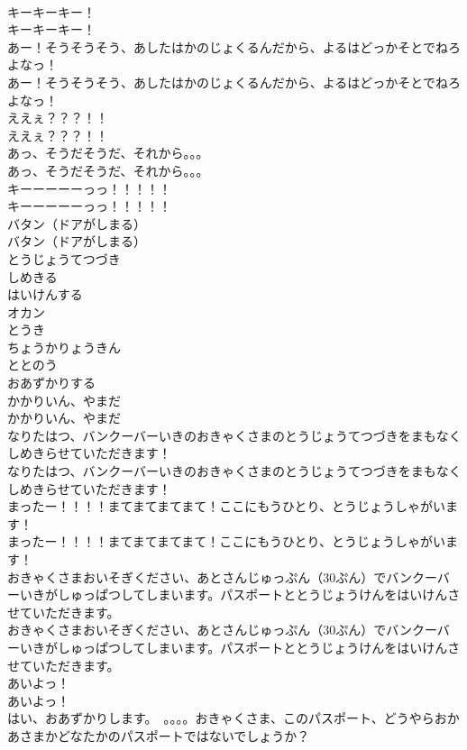 \documentclass[8pt]{extreport}
\begin{document}
\begin{CJK}{UTF8}{min}
\\	キーキーキー！
\\	キーキーキー！
\\	あー！そうそうそう、あしたはかのじょくるんだから、よるはどっかそとでねろよなっ！
\\	あー！そうそうそう、あしたはかのじょくるんだから、よるはどっかそとでねろよなっ！
\\	ええぇ？？？！！
\\	ええぇ？？？！！
\\	あっ、そうだそうだ、それから。。。
\\	あっ、そうだそうだ、それから。。。
\\	キーーーーーっっ！！！！！
\\	キーーーーーっっ！！！！！
\\	バタン（ドアがしまる）
\\	バタン（ドアがしまる）
\\	とうじょうてつづき
\\	しめきる
\\	はいけんする
\\	オカン
\\	とうき
\\	ちょうかりょうきん
\\	ととのう
\\	おあずかりする
\\	かかりいん、やまだ
\\	かかりいん、やまだ
\\	なりたはつ、バンクーバーいきのおきゃくさまのとうじょうてつづきをまもなくしめきらせていただきます！
\\	なりたはつ、バンクーバーいきのおきゃくさまのとうじょうてつづきをまもなくしめきらせていただきます！
\\	まったー！！！！まてまてまてまて！ここにもうひとり、とうじょうしゃがいます！
\\	まったー！！！！まてまてまてまて！ここにもうひとり、とうじょうしゃがいます！
\\	おきゃくさまおいそぎください、あとさんじゅっぷん（30ぷん）でバンクーバーいきがしゅっぱつしてしまいます。パスポートととうじょうけんをはいけんさせていただきます。
\\	おきゃくさまおいそぎください、あとさんじゅっぷん（30ぷん）でバンクーバーいきがしゅっぱつしてしまいます。パスポートととうじょうけんをはいけんさせていただきます。
\\	あいよっ！
\\	あいよっ！
\\	はい、おあずかりします。　。。。。おきゃくさま、このパスポート、どうやらおかあさまかどなたかのパスポートではないでしょうか？

\end{CJK}
\end{document}
